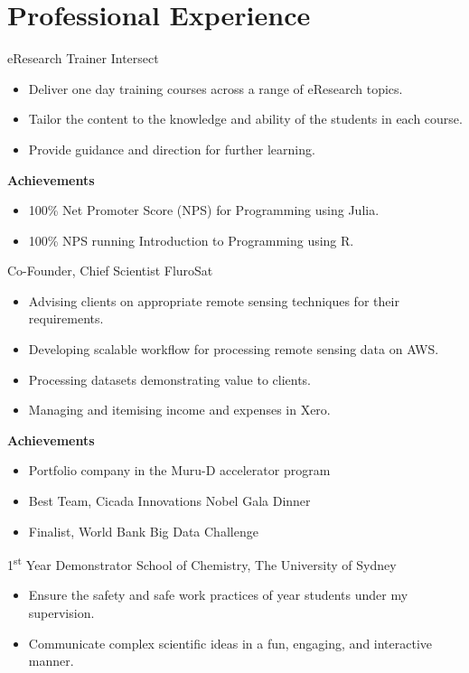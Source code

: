 \section{Professional Experience}

{eResearch Trainer}
{Intersect}{}{}
{%
  \begin{itemize}
    \item Deliver one day training courses across a range of eResearch topics.
    \item Tailor the content to the knowledge and ability of the students in each
      course.
    \item Provide guidance and direction for further learning.
  \end{itemize}
  \textbf{Achievements}
  \begin{itemize}
    \item 100\% Net Promoter Score (NPS) for Programming using Julia.
    \item 100\% NPS running Introduction to Programming using R.
  \end{itemize}
}
\vspace{1em}

{Co-Founder, Chief Scientist}
{FluroSat}{}{}
{%
  \begin{itemize}
    \item Advising clients on appropriate remote sensing techniques for their
      requirements.
    \item Developing scalable workflow for processing remote sensing data on AWS.
    \item Processing datasets demonstrating value to clients.
    \item Managing and itemising income and expenses in Xero.
  \end{itemize}
  \textbf{Achievements}
  \begin{itemize}
    \item Portfolio company in the Muru-D accelerator program
    \item Best Team, Cicada Innovations Nobel Gala Dinner
    \item Finalist, World Bank Big Data Challenge
  \end{itemize}
}
\vspace{1em}

{1\textsuperscript{st} Year Demonstrator}
{School of Chemistry, The University of Sydney}
{}{}
{%
    \begin{itemize}
      \item Ensure the safety and safe work practices
        of  year students under my supervision.
      \item Communicate complex scientific ideas
        in a fun, engaging, and interactive manner.
    \end{itemize}
}
\vspace{1em}

